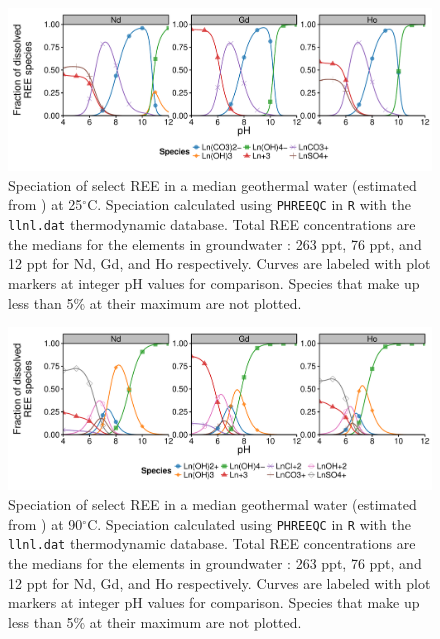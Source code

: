 \begin{figure}[htbp]
\begin{center}
\includegraphics[width = \textwidth]{REE-aq-chem-figs/REE-spec-med-geothermal-horiz.pdf}
\caption[Speciation of select REE in a median geothermal water at 25$^\circ$C.]{Speciation of select REE in a median geothermal water (estimated from \citet{ProdWat}) at 25$^\circ$C.
Speciation calculated using \texttt{PHREEQC} \citep{PHREEQC} in \texttt{R} \citep{R} with the \texttt{llnl.dat} thermodynamic database.
Total REE concentrations are the medians for the elements in groundwater \citep{Noack_EST_2014}: 263 ppt, 76 ppt, and 12 ppt for Nd, Gd, and Ho respectively.
Curves are labeled with plot markers at integer pH values for comparison.
Species that make up less than 5\% at their maximum are not plotted.}
\label{fig:REE-spec-geothermal}
\end{center}
\end{figure}

\begin{figure}[htbp]
\begin{center}
\includegraphics[width = \textwidth]{REE-aq-chem-figs/REE-spec-med-geothermal-90C-horiz.pdf}
\caption[Speciation of select REE in a median geothermal water at 90$^\circ$C.]{Speciation of select REE in a median geothermal water (estimated from \citet{ProdWat}) at 90$^\circ$C.
Speciation calculated using \texttt{PHREEQC} \citep{PHREEQC} in \texttt{R} \citep{R} with the \texttt{llnl.dat} thermodynamic database.
Total REE concentrations are the medians for the elements in groundwater \citep{Noack_EST_2014}: 263 ppt, 76 ppt, and 12 ppt for Nd, Gd, and Ho respectively.
Curves are labeled with plot markers at integer pH values for comparison.
Species that make up less than 5\% at their maximum are not plotted.}
\label{fig:REE-spec-geothermal-hot}
\end{center}
\end{figure}

